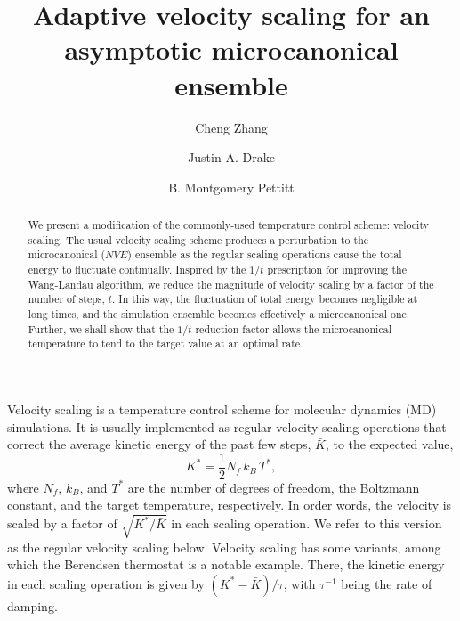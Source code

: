 \documentclass[reprint]{revtex4-1}
\begin{document}
\title{Adaptive velocity scaling for an asymptotic
microcanonical ensemble}

\author{Cheng Zhang}
\author{Justin A. Drake}
\author{B. Montgomery Pettitt}

\begin{abstract}
  We present a modification of the commonly-used
  temperature control scheme: velocity scaling.
  The usual velocity scaling scheme produces a perturbation to
  the microcanonical ($NVE$) ensemble
  as the regular scaling operations cause the total energy to fluctuate continually.
  Inspired by the $1/t$ prescription for improving the Wang-Landau algorithm,
  we reduce
  the magnitude of velocity scaling
  by a factor of the number of steps, $t$.
  In this way,
  the fluctuation of total energy becomes negligible at long times,
  and the simulation ensemble becomes effectively
  a microcanonical one.
  Further, we shall show that the $1/t$ reduction factor
  allows the microcanonical temperature to tend to the target value
  at an optimal rate.
\end{abstract}

\maketitle



Velocity scaling is a temperature control scheme
for molecular dynamics (MD) simulations.
%
It is usually implemented as
regular velocity scaling operations
that correct the average
kinetic energy of the past few steps, $\bar K$,
to the expected value\cite{frenkel, haile},
%
\begin{equation}
  K^* = \frac{1}{2} N_f \, k_B \, T^*
  ,
  \label{eq:K_canon}
\end{equation}
%
where $N_f$, $k_B$, and $T^*$ are the number of degrees of freedom,
the Boltzmann constant, and the target temperature, respectively.
%
In order words,
the velocity is scaled by a factor of
$\sqrt{ K^* / \bar K }$
in each scaling operation.
%
We refer to this version as the regular velocity scaling below.
%
Velocity scaling has some variants,
among which
the Berendsen thermostat\cite{berendsen1984}
is a notable example.
%
There,
the kinetic energy in each scaling operation
is given by
$\left( K^* - \bar K \right)/\tau$,
with $\tau^{-1}$ being the rate of damping.
\end{document}
